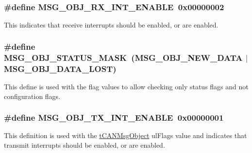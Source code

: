 \subsubsection[{\texorpdfstring{M\+S\+G\+\_\+\+O\+B\+J\+\_\+\+R\+X\+\_\+\+I\+N\+T\+\_\+\+E\+N\+A\+B\+LE}{MSG_OBJ_RX_INT_ENABLE}}]{\setlength{\rightskip}{0pt plus 5cm}\#define M\+S\+G\+\_\+\+O\+B\+J\+\_\+\+R\+X\+\_\+\+I\+N\+T\+\_\+\+E\+N\+A\+B\+LE~0x00000002}\hypertarget{group__can__api_ga8e611898e5a16c95b1e9ed517d84b463}{}\label{group__can__api_ga8e611898e5a16c95b1e9ed517d84b463}
This indicates that receive interrupts should be enabled, or are enabled. 
\subsubsection[{\texorpdfstring{M\+S\+G\+\_\+\+O\+B\+J\+\_\+\+S\+T\+A\+T\+U\+S\+\_\+\+M\+A\+SK}{MSG_OBJ_STATUS_MASK}}]{\setlength{\rightskip}{0pt plus 5cm}\#define M\+S\+G\+\_\+\+O\+B\+J\+\_\+\+S\+T\+A\+T\+U\+S\+\_\+\+M\+A\+SK~({\bf M\+S\+G\+\_\+\+O\+B\+J\+\_\+\+N\+E\+W\+\_\+\+D\+A\+TA} $\vert$ {\bf M\+S\+G\+\_\+\+O\+B\+J\+\_\+\+D\+A\+T\+A\+\_\+\+L\+O\+ST})}\hypertarget{group__can__api_gac00ece1facc432a0454b9de2e35ad9ad}{}\label{group__can__api_gac00ece1facc432a0454b9de2e35ad9ad}
This define is used with the flag values to allow checking only status flags and not configuration flags. 
\subsubsection[{\texorpdfstring{M\+S\+G\+\_\+\+O\+B\+J\+\_\+\+T\+X\+\_\+\+I\+N\+T\+\_\+\+E\+N\+A\+B\+LE}{MSG_OBJ_TX_INT_ENABLE}}]{\setlength{\rightskip}{0pt plus 5cm}\#define M\+S\+G\+\_\+\+O\+B\+J\+\_\+\+T\+X\+\_\+\+I\+N\+T\+\_\+\+E\+N\+A\+B\+LE~0x00000001}\hypertarget{group__can__api_ga72160bfa35ab86bf0e68c1e2c2dd67a2}{}\label{group__can__api_ga72160bfa35ab86bf0e68c1e2c2dd67a2}
This definition is used with the \hyperlink{structtCANMsgObject}{t\+C\+A\+N\+Msg\+Object} ul\+Flags value and indicates that transmit interrupts should be enabled, or are enabled. 

